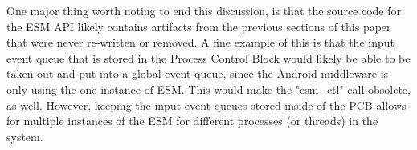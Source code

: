 \documentclass[10pt,journal,compsoc]{IEEEtran}
\begin{document}
One major thing worth noting to end this discussion, is that the source code for the ESM API likely contains artifacts from the previous sections of this paper that were never re-written or removed. A fine example of this is that the input event queue that is stored in the Process Control Block would likely be able to be taken out and put into a global event queue, since the Android middleware is only using the one instance of ESM. This would make the "esm\_ctl" call obsolete, as well. However, keeping the input event queues stored inside of the PCB allows for multiple instances of the ESM for different processes (or threads) in the system.


{}
\textbf{}
\end{document}
